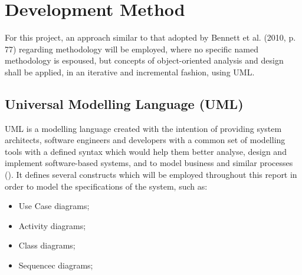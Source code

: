 \section{Development Method} \label{sec:DevelopmentMethod}
For this project, an approach similar to that adopted by Bennett et al. (2010,
p. 77) \nocite{bennett2010object} regarding methodology will be employed, where
no specific named methodology is espoused, but concepts of object-oriented
analysis and design shall be applied, in an iterative and incremental fashion,
using UML.

\subsection{Universal Modelling Language (UML)}
\label{sec:Introduction.methodology.uml}

UML is a modelling language created with the intention of providing system
architects, software engineers and developers with a common set of modelling
tools with a defined syntax which would help them better analyse, design and
implement software-based systems, and to model business and similar processes
(\cite[][p.~43]{omg2015uml}). It defines several constructs which will be
employed throughout this report in order to model the specifications of the
system, such as:
\begin{itemize}
  \item
    Use Case diagrams;

  \item
    Activity diagrams;

  \item
    Class diagrams;
    
  \item
    Sequencec diagrams;
\end{itemize}
